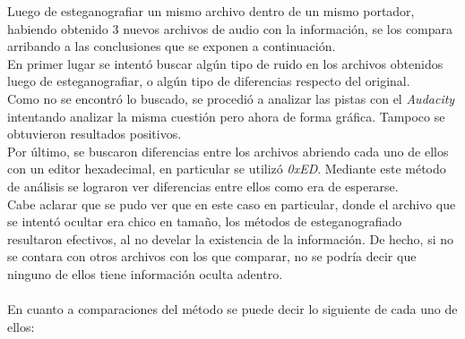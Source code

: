 \documentclass{article}
\begin{document}
\noindent Luego de esteganografiar un mismo archivo dentro de un mismo portador, habiendo obtenido 3 nuevos archivos de audio con la información, se los compara arribando a las conclusiones que se exponen a continuación.\\
En primer lugar se intentó buscar algún tipo de ruido en los archivos obtenidos luego de esteganografiar, o algún tipo de diferencias respecto del original.\\
Como no se encontró lo buscado, se procedió a analizar las pistas con el \textit{Audacity} intentando analizar la misma cuestión pero ahora de forma gráfica. Tampoco se obtuvieron resultados positivos.\\
Por último, se buscaron diferencias entre los archivos abriendo cada uno de ellos con un editor hexadecimal, en particular se utilizó \textit{0xED}. Mediante este método de análisis se lograron ver diferencias entre ellos como era de esperarse.\\
Cabe aclarar que se pudo ver que en este caso en particular, donde el archivo que se intentó ocultar era chico en tamaño, los métodos de esteganografiado resultaron efectivos, al no develar la existencia de la información. De hecho, si no se contara con otros archivos con los que comparar, no se podría decir que ninguno de ellos tiene información oculta adentro.\\
\\
\noindent En cuanto a comparaciones del método se puede decir lo siguiente de cada uno de ellos:\\
\end{document}
